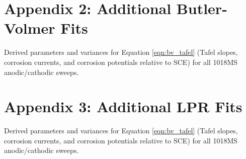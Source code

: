 \documentclass[12pt, titlepage]{article}
\begin{document}
\section{Appendix 2: Additional Butler-Volmer Fits}

	\begin{table}[htp]
		\centering
		
		
		\caption{Derived parameters and variances for Equation \ref{eqn:bv_tafel} (Tafel slopes, corrosion currents, and corrosion potentials relative to SCE) for all 1018MS anodic/cathodic sweeps.}
		\label{table:anocat_full}
	\end{table}

\pagebreak

\section{Appendix 3: Additional LPR Fits}

	\begin{table}[h!]
		\centering
		
		
		\caption{Derived parameters and variances for Equation \ref{eqn:bv_tafel} (Tafel slopes, corrosion currents, and corrosion potentials relative to SCE) for all 1018MS anodic/cathodic sweeps.}
		\label{table:lpr_full}
	\end{table}
\end{document}
